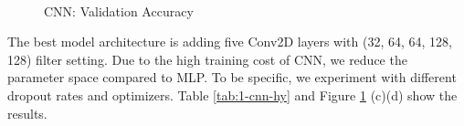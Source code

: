 \documentclass{article}
\begin{document}
\begin{figure}[!ht]
    \centering
        \hspace{1cm}
        \\
        \hspace{1cm}
    \caption{CNN: Validation Accuracy}
    \label{fig:1-cnn-arch}
\end{figure}
\par
The best model architecture is adding five Conv2D layers with (32, 64, 64, 128, 128) filter setting. Due to the high training cost of CNN, we reduce the parameter space compared to MLP. To be specific, we experiment with different dropout rates and optimizers. Table \ref{tab:1-cnn-hy} and Figure \ref{fig:1-cnn-arch} (c)(d) show the results.
\end{document}
